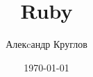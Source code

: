 \documentclass[a4paper, 12pt, oneside, openany, book]{ncc}
\begin{document}
\author{Алекcандр Круглов}
\title{Ruby}
\date{\today}
\maketitle

% 

% 
% 
% 
% 

% 
% 
% 
% 
% 
% 
% 

% 
% 
% 
% 
% 
% 
% 



% 
% 
% 

% 

% 
\end{document}
